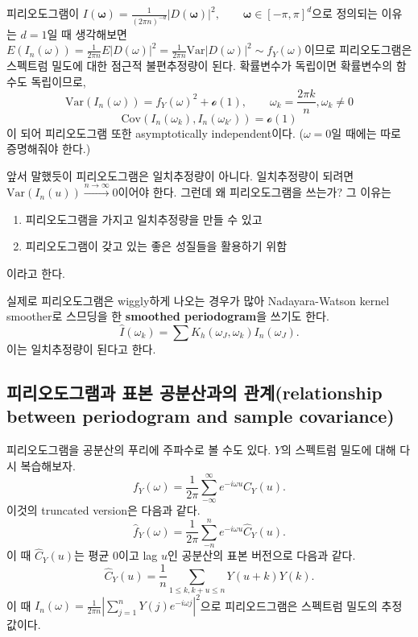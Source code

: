 \documentclass[b5paper,]{scrbook}
\theoremstyle{plain}
\theoremstyle{definition}
\numberwithin{equation}{section}
\begin{document}
피리오도그램이 \(I(\boldsymbol{\omega})=\frac{1}{(2\pi n)^{-d}}|D(\boldsymbol{\omega})|^{2}, \qquad{\boldsymbol{\omega}\in[-\pi,\pi]^{d}}\)으로 정의되는 이유는 \(d=1\)일 때 생각해보면 \(E(I_{n}(\omega))=\frac{1}{2\pi n}E|D(\omega)|^{2}= \frac{1}{2\pi n}\text{Var}|D(\omega)|^{2} \sim f_{Y}(\omega)\)이므로 피리오도그램은 스펙트럼 밀도에 대한 점근적 불편추정량이 된다. 확률변수가 독립이면 확률변수의 함수도 독립이므로,
\[\text{Var}(I_{n}(\omega)) = f_{Y}(\omega)^{2} + \mathcal{o}(1), \qquad{\omega_{k}=\frac{2\pi k}{n}, \omega_{k}\neq 0}\]
\[\text{Cov}(I_{n}(\omega_{k}),I_{n}(\omega_{k'}))=\mathcal{o}(1)\]
이 되어 피리오도그램 또한 asymptotically independent이다. (\(\omega=0\)일 때에는 따로 증명해줘야 한다.)

앞서 말했듯이 피리오도그램은 일치추정량이 아니다. 일치추정량이 되려면 \(\text{Var}(I_{n}(u))\stackrel{n\rightarrow\infty}{\rightarrow}0\)이어야 한다. 그런데 왜 피리오도그램을 쓰는가? 그 이유는

\begin{enumerate}
\def\labelenumi{\arabic{enumi}.}
\item
  피리오도그램을 가지고 일치추정량을 만들 수 있고
\item
  피리오도그램이 갖고 있는 좋은 성질들을 활용하기 위함
\end{enumerate}

이라고 한다.

실제로 피리오도그램은 wiggly하게 나오는 경우가 많아 Nadayara-Watson kernel smoother로 스므딩을 한 \textbf{smoothed periodogram}을 쓰기도 한다.
\[\hat{I}(\omega_{k})=\sum K_{h}(\omega_{J},\omega_{k})I_{n}(\omega_{J}).\]
이는 일치추정량이 된다고 한다.

\hypertarget{---relationship-between-periodogram-and-sample-covariance}{%
\subsection{피리오도그램과 표본 공분산과의 관계(relationship between periodogram and sample covariance)}\label{---relationship-between-periodogram-and-sample-covariance}}

피리오도그램을 공분산의 푸리에 주파수로 볼 수도 있다. \(Y\)의 스펙트럼 밀도에 대해 다시 복습해보자.
\[f_{Y}(\omega)=\frac{1}{2\pi}\sum_{-\infty}^{\infty}e^{-i\omega u}C_{Y}(u).\]
이것의 truncated version은 다음과 같다.
\[\hat{f}_{Y}(\omega)=\frac{1}{2\pi}\sum_{-n}^{n}e^{-i\omega u}\hat{C}_{Y}(u).\]
이 때 \(\hat{C}_{Y}(u)\)는 평균 0이고 lag \(u\)인 공분산의 표본 버전으로 다음과 같다.
\[\hat{C}_{Y}(u)=\frac{1}{n}\sum_{1\leq k, k+u\leq n}Y(u+k)Y(k).\]
이 때 \(I_{n}(\omega)=\frac{1}{2\pi n}|\sum_{j=1}^{n}Y(j)e^{-i\omega j}|^{2}\)으로 피리오드그램은 스펙트럼 밀도의 추정값이다.
\end{document}
